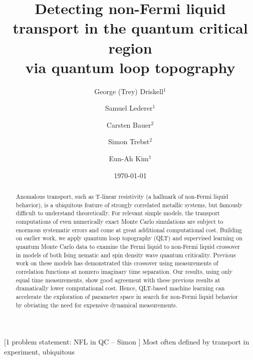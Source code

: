 \documentclass[amsmath,amssymb, aps, prx, longbibliography, twocolumn]{revtex4-1}
\begin{document}
\title{ Detecting non-Fermi liquid transport in the quantum critical region \\ via quantum loop topography}

\author{George (Trey) Driskell$^1$}
\author{Samuel Lederer$^1$}
\author{Carsten Bauer$^2$}
\author{Simon Trebst$^2$}
\author{Eun-Ah Kim$^1$}

%

\date{\today}

\begin{abstract}
Anomalous transport, such as T-linear resistivity (a hallmark of non-Fermi liquid behavior), is a ubiquitous feature of strongly correlated metallic systems, but famously difficult to understand theoretically. For relevant simple models, the transport computations of even numerically exact Monte Carlo simulations are subject to enormous systematic errors and come at great additional computational cost. Building on earlier work, we apply quantum loop topography (QLT) and supervised learning on quantum Monte Carlo data to examine the Fermi liquid to non-Fermi liquid crossover in models of both Ising nematic and spin density wave quantum criticality. Previous work on these models has demonstrated this crossover using measurements of correlation functions at nonzero imaginary time separation. Our results, using only equal time measurements, show good agreement with these previous results at dramatically lower computational cost. Hence, QLT-based machine learning can accelerate the exploration of parameter space in search for non-Fermi liquid behavior by obviating the need for expensive dynamical measurements.
\end{abstract}

\maketitle

[1 problem statement: NFL in QC -- Simon ]
Most often defined by transport in experiment, ubiquitous
\\
\\
\\
\\
\\
\\
\\
\\
\\
\\
\\
\end{document}

